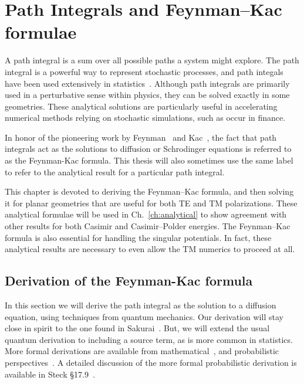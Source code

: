 \chapter{Path Integrals and Feynman--Kac formulae}

\label{ch:feynman_kac}

A path integral is a sum over all possible paths a system might explore.
The path integral is a powerful way to represent stochastic processes, and path integals have been used
extensively in statistics~\cite{Karatzas1991, Durrett1996,DelMoral2004}.  
Although path integrals are primarily used in a perturbative sense within physics, 
they can be solved exactly in some geometries.
These analytical solutions are particularly useful in accelerating numerical methods relying 
on stochastic simulations, such as occur in finance.  

In honor of the pioneering work by Feynman~\cite{Feynman1950} and Kac~\cite{Kac1949}, the fact that path integrals
act as the solutions to diffusion or Schrodinger equations is referred to as the Feynman-Kac 
formula.  This thesis will also sometimes use the same label to refer to the analytical
result for a particular path integral.  

This chapter is devoted to deriving the Feynman--Kac formula, and then solving
it for planar geometries that are useful for both TE and TM polarizations.
These analytical formulae will be used in Ch.~\ref{ch:analytical} to show agreement 
with other results for both Casimir and Casimir--Polder energies.
The Feynman--Kac formula is also essential for handling the singular potentials.  
In fact, these analytical results are necessary to even allow the TM numerics to proceed at all.

\section{Derivation of the Feynman-Kac formula }

In this section we will derive the path integral as the solution to a diffusion equation,
using techniques from quantum mechanics.
Our derivation will stay close in spirit to the  one found in Sakurai~\cite{Sakurai1994}.
But, we will extend the usual quantum derivation to including a source term, as is more common in statistics.
More formal derivations are available from mathematical~\cite{Cartier2004},
and probabilistic perspectives~\cite{Karatzas1991, Durrett1996}.  
A detailed discussion of the more formal probabilistic derivation is available in Steck \S 17.9~\cite{SteckNotes}.

